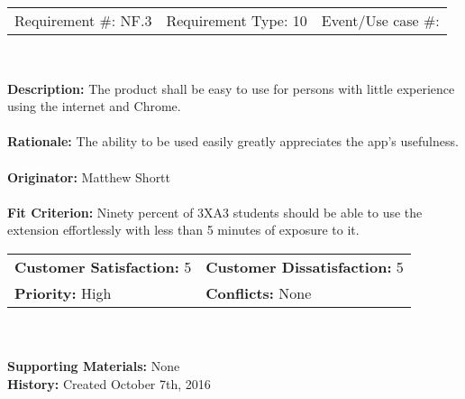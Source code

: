 \documentclass[12pt, titlepage]{article}
\begin{document}
\begin{framed}
	
	\begin{center}
		
		\begin{tabular}{ l c r }
			Requirement \#: NF.3 & Requirement Type: 10 & Event/Use case \#: \\
		\end{tabular} \\
	\end{center}
	\textbf{Description:} The product shall be easy to use for persons with little experience 
	using the internet and Chrome.\\
	\\
	\textbf{Rationale:} The ability to be used easily greatly appreciates the app's 
	usefulness.  \\
	\\
	\textbf{Originator:} Matthew Shortt \\
	\\
	\textbf{Fit Criterion:} Ninety percent of 3XA3 students should be able to use the 
	extension effortlessly with less than 5 minutes of exposure to it.  
	\\
	
	\begin{tabular}{ll}
		\textbf{Customer Satisfaction:} 5 & \textbf{Customer Dissatisfaction:} 5 \\
		\textbf{Priority:} High & \textbf{Conflicts:} None\\
	\end{tabular} \\
	\\
	\textbf{Supporting Materials:} None \\
	\textbf{History:} Created October 7th, 2016
	
\end{framed}
\end{document}
